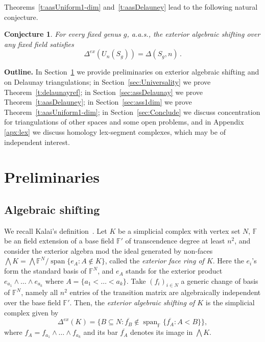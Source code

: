 \documentclass[reqno,english]{amsart}
\newtheorem{conjecture}[theorem]{Conjecture}
\numberwithin{claimcounter}{theorem}
\theoremstyle{remark}
\theoremstyle{definition}
\numberwithin{theorem}{section}
\newcommand{\F}{\mathbb{F}}
\DeclareMathOperator{\SPAN}{span}
\newcommand{\exshift}[1]{\Delta^{ex}(#1)}
\begin{document}
Theorems~\ref{t:aasUniform1-dim} and~\ref{t:aasDelauney} lead to the following natural conjecture.
\begin{conjecture}\label{conj:uniform_surface}
For every fixed genus $g$, a.a.s., the exterior algebraic shifting over any fixed field satisfies
     $$\exshift {U_n(S_g)}
     =\Delta(S_g,n)\,.$$
\end{conjecture}



{\bf Outline.} 
In Section~\ref{sec:Prelim} we provide preliminaries on exterior algebraic shifting and on Delaunay triangulations; 
in Section~\ref{sec:Universality} we prove Theorem~\ref{t:delaunayref};  in Section~\ref{sec:assDelaunay} we prove Theorem~\ref{t:aasDelauney}; in Section~\ref{sec:ass1dim} we prove Theorem~\ref{t:aasUniform1-dim}; in Section~\ref{sec:Conclude} we discuss concentration for triangulations of other spaces and some open problems, and in Appendix \ref{apx:lex} we discuss homology lex-segment complexes, which may be of independent interest.

\section{Preliminaries}\label{sec:Prelim} 

\subsection{Algebraic shifting}
We recall Kalai's definition~\cite{KalaiPart1}.
Let $K$ be a simplicial complex with vertex set $N$, $\F$ be an field extension of a base field $\F'$ of transcendence degree at least $n^2$, and consider the exterior algebra mod the ideal generated by non-faces $\bigwedge K = \bigwedge \F^{N}/\SPAN \{e_A \colon A \notin K\}$, called the  \emph{exterior face ring of $K$}. Here the $e_i$'s form the standard basis of $\F^{N}$, and $e_A$ stands for the exterior product $e_{a_1}\wedge\ldots\wedge e_{a_k}$ where $A=\{a_1<\ldots<a_k\}$.
Take $(f_i)_{i\in N}$ a generic change of basis of $\F^{N}$, namely all $n^2$ entries of the transition matrix are algebraically independent over the base field $\F'$. Then, the \emph{exterior algebraic shifting of $K$} is the simplicial complex given by $$\exshift K = \{B \subseteq N \colon \overline{f_B} \notin \SPAN_{\F} \{\overline{f_A}\colon A<B\}\},$$
where $f_A=f_{a_1}\wedge\ldots\wedge f_{a_k}$ and its bar $\overline{f_A}$ denotes its image in $\bigwedge K$.
\end{document}
